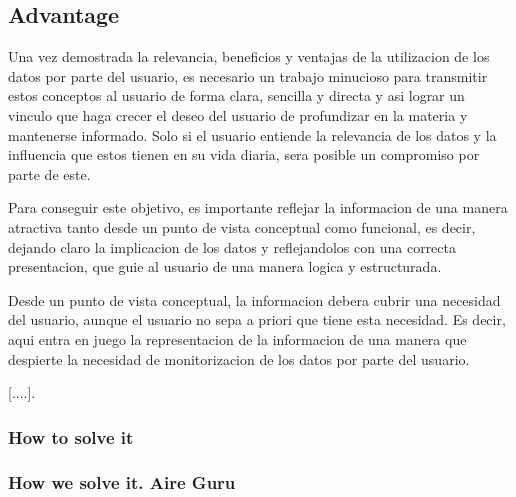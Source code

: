 \subsection{Advantage}
Una vez demostrada la relevancia, beneficios y ventajas de la utilizacion de los datos por parte del usuario, es necesario un trabajo minucioso para
transmitir estos conceptos al usuario de forma clara, sencilla y directa y asi lograr un vinculo que haga crecer el deseo del usuario de profundizar en la materia y
mantenerse informado. 
Solo si el usuario entiende la relevancia de los datos y la influencia que estos tienen en su vida diaria, sera posible un compromiso por parte de este.

Para conseguir este objetivo, es importante reflejar la informacion de una manera atractiva tanto desde un punto de vista conceptual como funcional, 
es decir, dejando claro la implicacion de los datos y reflejandolos con una correcta presentacion, que guie al usuario de una manera logica y estructurada.

Desde un punto de vista conceptual, la informacion debera cubrir una necesidad del usuario, aunque el usuario no sepa a priori que tiene esta necesidad.
Es decir, aqui entra en juego la representacion de la informacion de una manera que despierte la necesidad de monitorizacion de los datos por parte
del usuario.

[....].



\subsubsection{How to solve it} 


\subsubsection{How we solve it. Aire Guru} 
 
\begin{itemize}
    \done
    \crossed
    
\end{itemize}
\newpage